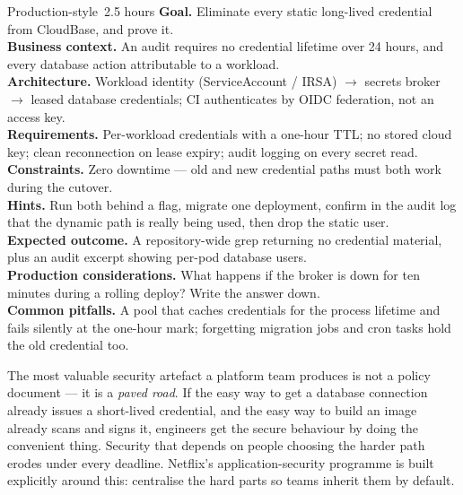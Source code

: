 \begin{minilab}{Production-style}{~2.5 hours}
\textbf{Goal.} Eliminate every static long-lived credential from CloudBase, and prove it.\\
\textbf{Business context.} An audit requires no credential lifetime over 24 hours, and every database action attributable to a workload.\\
\textbf{Architecture.} Workload identity (ServiceAccount / IRSA) $\rightarrow$ secrets broker $\rightarrow$ leased database credentials; CI authenticates by OIDC federation, not an access key.\\
\textbf{Requirements.} Per-workload credentials with a one-hour TTL; no stored cloud key; clean reconnection on lease expiry; audit logging on every secret read.\\
\textbf{Constraints.} Zero downtime --- old and new credential paths must both work during the cutover.\\
\textbf{Hints.} Run both behind a flag, migrate one deployment, confirm in the audit log that the dynamic path is really being used, then drop the static user.\\
\textbf{Expected outcome.} A repository-wide grep returning no credential material, plus an audit excerpt showing per-pod database users.\\
\textbf{Production considerations.} What happens if the broker is down for ten minutes during a rolling deploy? Write the answer down.\\
\textbf{Common pitfalls.} A pool that caches credentials for the process lifetime and fails silently at the one-hour mark; forgetting migration jobs and cron tasks hold the old credential too.
\end{minilab}


\begin{seniornote}
The most valuable security artefact a platform team produces is not a policy document --- it is a \emph{paved road}. If the easy way to get a database connection already issues a short-lived credential, and the easy way to build an image already scans and signs it, engineers get the secure behaviour by doing the convenient thing. Security that depends on people choosing the harder path erodes under every deadline. Netflix's application-security programme is built explicitly around this: centralise the hard parts so teams inherit them by default.
\end{seniornote}

